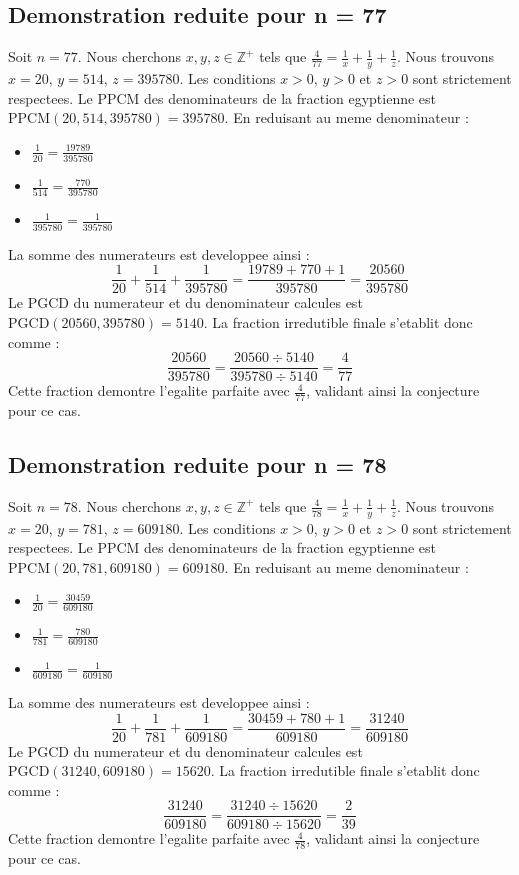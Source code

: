 \documentclass[11pt,a4paper]{article}
\begin{document}
\subsection{Demonstration reduite pour n = 77}
Soit $n = 77$. Nous cherchons $x, y, z \in \mathbb{Z}^{+}$ tels que $\frac{4}{77} = \frac{1}{x} + \frac{1}{y} + \frac{1}{z}$.
Nous trouvons $x = 20$, $y = 514$, $z = 395780$.
Les conditions $x > 0$, $y > 0$ et $z > 0$ sont strictement respectees.
Le PPCM des denominateurs de la fraction egyptienne est $\text{PPCM}(20, 514, 395780) = 395780$.
En reduisant au meme denominateur :
\begin{itemize}
    \item $\frac{1}{20} = \frac{19789}{395780}$
    \item $\frac{1}{514} = \frac{770}{395780}$
    \item $\frac{1}{395780} = \frac{1}{395780}$
\end{itemize}
La somme des numerateurs est developpee ainsi :
$$ \frac{1}{20} + \frac{1}{514} + \frac{1}{395780} = \frac{19789 + 770 + 1}{395780} = \frac{20560}{395780} $$
Le PGCD du numerateur et du denominateur calcules est $\text{PGCD}(20560, 395780) = 5140$.
La fraction irredutible finale s'etablit donc comme :
$$ \frac{20560}{395780} = \frac{20560 \div 5140}{395780 \div 5140} = \frac{4}{77} $$
Cette fraction demontre l'egalite parfaite avec $\frac{4}{77}$, validant ainsi la conjecture pour ce cas.

\subsection{Demonstration reduite pour n = 78}
Soit $n = 78$. Nous cherchons $x, y, z \in \mathbb{Z}^{+}$ tels que $\frac{4}{78} = \frac{1}{x} + \frac{1}{y} + \frac{1}{z}$.
Nous trouvons $x = 20$, $y = 781$, $z = 609180$.
Les conditions $x > 0$, $y > 0$ et $z > 0$ sont strictement respectees.
Le PPCM des denominateurs de la fraction egyptienne est $\text{PPCM}(20, 781, 609180) = 609180$.
En reduisant au meme denominateur :
\begin{itemize}
    \item $\frac{1}{20} = \frac{30459}{609180}$
    \item $\frac{1}{781} = \frac{780}{609180}$
    \item $\frac{1}{609180} = \frac{1}{609180}$
\end{itemize}
La somme des numerateurs est developpee ainsi :
$$ \frac{1}{20} + \frac{1}{781} + \frac{1}{609180} = \frac{30459 + 780 + 1}{609180} = \frac{31240}{609180} $$
Le PGCD du numerateur et du denominateur calcules est $\text{PGCD}(31240, 609180) = 15620$.
La fraction irredutible finale s'etablit donc comme :
$$ \frac{31240}{609180} = \frac{31240 \div 15620}{609180 \div 15620} = \frac{2}{39} $$
Cette fraction demontre l'egalite parfaite avec $\frac{4}{78}$, validant ainsi la conjecture pour ce cas.
\end{document}
